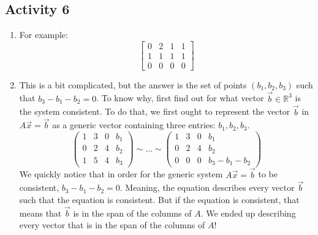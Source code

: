 \subsection{Activity 6}
\begin{enumerate}
	\item For example: \[\begin{bmatrix}0 & 2 & 1 & 1 \\ 1 & 1 & 1 & 1 \\ 0 & 0 & 0 & 0\end{bmatrix}\]
	\item This is a bit complicated, but the answer is the set of points \((b_1, b_2, b_3)\) such that \(b_3 - b_1 - b_2 = 0\). To know why, first find out
		 for what vector \(\vec{b} \in \mathbb{R}^3\) is the system consistent. To do that, we first ought to represent the vector \(\vec{b}\) in 
		\(A\vec{x} = \vec{b}\) as a generic vector containing three entries: \(b_1, b_2, b_3\).
		\[\left(\begin{array}{ccc|c} 1 & 3 & 0 & b_1 \\ 0 & 2 & 4  & b_ 2 \\ 1 & 5 & 4 & b_3\end{array}\right) \sim \dots 
		  \sim \left(\begin{array}{ccc|c} 1 & 3 & 0 & b_1 \\ 0 & 2 & 4  & b_ 2 \\ 0 & 0 & 0 & b_3 - b_1 - b_2\end{array}\right)\]
		 We quickly notice that in order for the generic system \(A\vec{x} = \vec{b}\) to be consistent, \(b_3 - b_1 - b_2 = 0\). Meaning, the equation 
		describes every vector \(\vec{b}\) such that the equation is consistent. But if the equation is consistent, that means that \(\vec{b}\) is in the span
		of the columns of \(A\). We ended up describing every vector that is in the span of the columns of \(A\)! 
\end{enumerate}
